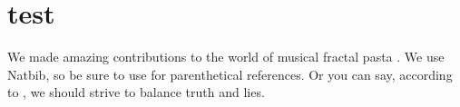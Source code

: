 \documentclass[12pt]{article}
\begin{document}
      
      



  \section{test}
    We made amazing contributions to the world of musical fractal pasta 
    \citep{McDonald2017,Tibshirani2013}. We use Natbib, so be sure to use
    \citep{Stein1981} for parenthetical references. Or you can say, according to
    \citet{HastieTibshirani2009}, we should strive to balance truth and lies.




\end{document}

